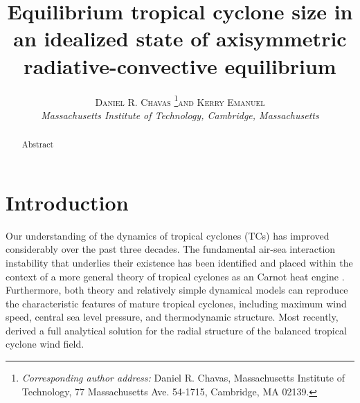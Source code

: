 \documentclass[12pt]{article}
\newcommand{\myabstract}{Abstract}
\begin{document}
%
%
\title{\textbf{\large{Equilibrium tropical cyclone size in an idealized state of axisymmetric radiative-convective equilibrium}}}
%
%
\author{\textsc{Daniel R. Chavas}
				\thanks{\textit{Corresponding author address:} 
				Daniel R. Chavas, Massachusetts Institute of Technology, 
				77 Massachusetts Ave. 54-1715, Cambridge, MA 02139. 
				}\quad\textsc{and Kerry Emanuel}\\
\textit{\footnotesize{Massachusetts Institute of Technology, Cambridge, Massachusetts}}
}
%
{
\twocolumn[
\begin{@twocolumnfalse}
\amstitle

\begin{center}
\begin{minipage}{13.0cm}
\begin{abstract}
	\myabstract
	\newline
	\begin{center}
		\rule{38mm}{0.2mm}
	\end{center}
\end{abstract}
\end{minipage}
\end{center}
\end{@twocolumnfalse}
]
}
{
\amstitle
\begin{abstract}
\myabstract
\end{abstract}
\newpage
}

\section{Introduction}

Our understanding of the dynamics of tropical cyclones (TCs) has improved considerably over the past three decades. The fundamental air-sea interaction instability that underlies their existence has been identified and placed within the context of a more general theory of tropical cyclones as an Carnot heat engine \citep{Emanuel_1986}. Furthermore, both theory and relatively simple dynamical models \citep{Emanuel_1995a, Rotunno_Emanuel_1987} can reproduce the characteristic features of mature tropical cyclones, including maximum wind speed, central sea level pressure, and thermodynamic structure. Most recently, \cite{Emanuel_Rotunno_2011} derived a full analytical solution for the radial structure of the balanced tropical cyclone wind field.
\end{document}
